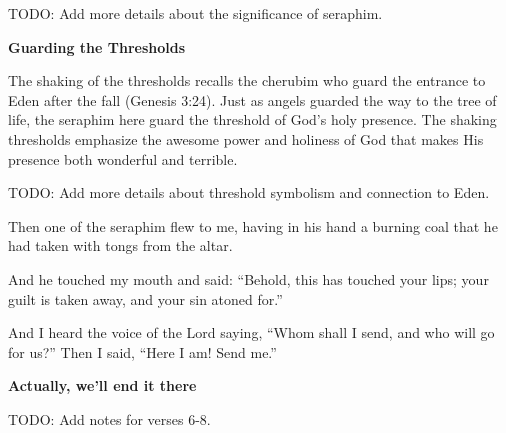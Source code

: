 \documentclass[11pt]{article}
\begin{document}
{\vspace{1em}}
TODO: Add more details about the significance of seraphim.

{\large\bfseries Guarding the Thresholds}
{\vspace{1em}}

The shaking of the thresholds recalls the cherubim who guard the entrance to Eden after the fall (Genesis 3:24). Just as angels guarded the way to the tree of life, the seraphim here guard the threshold of God's holy presence. The shaking thresholds emphasize the awesome power and holiness of God that makes His presence both wonderful and terrible.

{\vspace{1em}}
TODO: Add more details about threshold symbolism and connection to Eden.

\begin{biblicaloutline}[Isaiah 6:6-8]
    

    \begin{versesection}{2em}
         Then one of the seraphim flew to me, having in his hand a burning coal that he had taken with tongs from the altar.

         And he touched my mouth and said: ``Behold, this has touched your lips; your guilt is taken away, and your sin atoned for.''
    \end{versesection}
    
    
    \begin{versesection}{2em}
         And I heard the voice of the Lord saying, ``Whom shall I send, and who will go for us?'' Then I said, ``Here I am! Send me.''
    \end{versesection}

\end{biblicaloutline}

{\large\bfseries Actually, we'll end it there}
{\vspace{1em}}

TODO: Add notes for verses 6-8.
\end{document}
